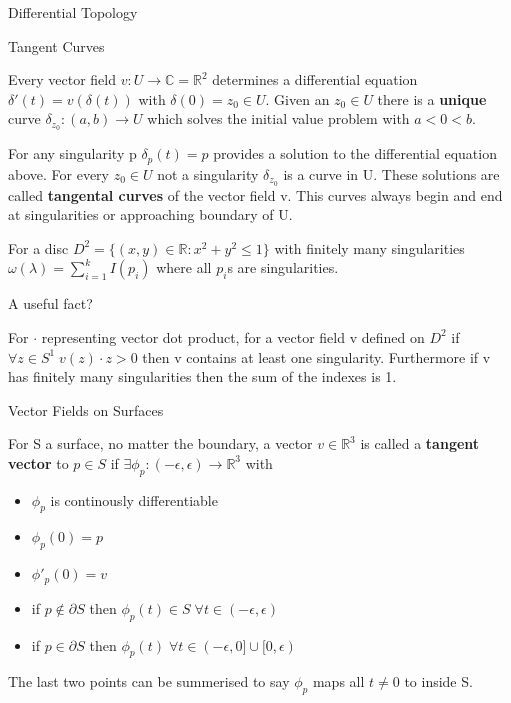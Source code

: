 \documentclass[12pt, letterpaper]{article}
\begin{document}
\begin{section}{Differential Topology}
  \begin{subsection}{Tangent Curves}

    Every vector field \(v: U \to \mathbb{C} = \mathbb{R}^{2}\) determines a
    differential equation \(\delta'(t) = v(\delta(t))\) with \(\delta(0) = z_{0}
    \in U\). Given an \(z_{0} \in U\) there is a \textbf{unique} curve \(\delta_{z_{0}}
    : (a, b) \to U\) which solves the initial value problem with \(a < 0 < b\).

    For any singularity p \(\delta_{p}(t) = p\) provides a solution to the
    differential equation above. For every \(z_{0} \in U\) not a singularity
    \(\delta_{z_{0}}\) is a curve in U. These solutions are called \textbf{tangental
      curves} of the vector field v. This curves always begin and end at
    singularities or approaching boundary of U.

    For a disc \(D^{2} = \{ (x, y) \in \mathbb{R} : x^{2} + y^{2} \leq 1\}\)
    with finitely many singularities \(\omega(\lambda) = \sum^{k}_{i = 1}I(p_{i})\)
    where all \(p_{i}\)s are singularities.

  \end{subsection}

  \begin{subsection}{A useful fact?}

    For \(\cdot\) representing vector dot product, for a vector field v defined
    on \(D^{2}\) if \(\forall z \in S^{1} \; v(z) \cdot z > 0\) then v contains
    at least one singularity. Furthermore if v has finitely many singularities
    then the sum of the indexes is 1.

  \end{subsection}

  \begin{subsection}{Vector Fields on Surfaces}

    For S a surface, no matter the boundary, a vector \(v \in \mathbb{R}^{3}\)
    is called a \textbf{tangent vector} to \(p \in S\) if \(\exists \phi_{p}
    : (-\epsilon, \epsilon) \to \mathbb{R}^{3}\) with
    \begin{itemize}
      \item \(\phi_{p}\) is continously differentiable
      \item \(\phi_{p}(0) = p\)
      \item \(\phi'_{p}(0) = v\)
      \item if \(p \notin \partial S\) then \(\phi_{p}(t) \in S \;
            \forall t \in (-\epsilon,\epsilon)\)
      \item if \(p \in \partial S\) then \(\phi_{p}(t) \;
            \forall t \in (-\epsilon, 0] \cup [0, \epsilon)\)
    \end{itemize}
    The last two points can be summerised to say \(\phi_{p}\) maps all \(t \neq 0\)
    to inside S.


\end{subsection}
\end{section}
\end{document}

